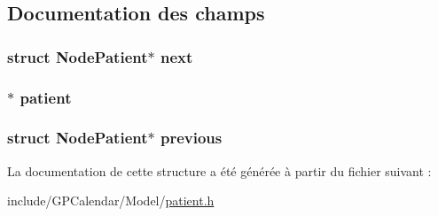 \subsection{Documentation des champs}
\hypertarget{struct_node_patient_aed83e2f44d9cd8414c6dceebd6e34f40}{
\subsubsection[{next}]{\setlength{\rightskip}{0pt plus 5cm}struct {\bf Node\-Patient}$\ast$ next}}\label{struct_node_patient_aed83e2f44d9cd8414c6dceebd6e34f40}
\hypertarget{struct_node_patient_a602d93e6dfbb9a54fc31419f2463ac2b}{
\subsubsection[{patient}]{$\ast$ patient}}\label{struct_node_patient_a602d93e6dfbb9a54fc31419f2463ac2b}
\hypertarget{struct_node_patient_ad96b030b2d205d958d0119a33cd84723}{
\subsubsection[{previous}]{\setlength{\rightskip}{0pt plus 5cm}struct {\bf Node\-Patient}$\ast$ previous}}\label{struct_node_patient_ad96b030b2d205d958d0119a33cd84723}


La documentation de cette structure a été générée à partir du fichier suivant \-:\begin{DoxyCompactItemize}
\item 
include/\-G\-P\-Calendar/\-Model/\hyperlink{patient_8h}{patient.\-h}\end{DoxyCompactItemize}
